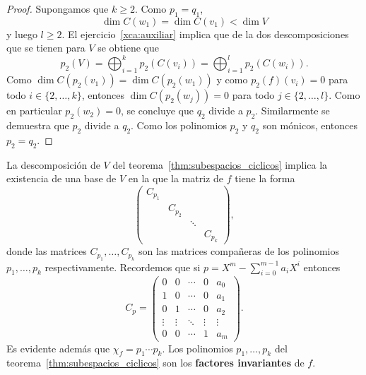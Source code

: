 \begin{thm}
\begin{proof}
        Supongamos que $k\geq2$. Como $p_1=q_1$, 
		\[
			\dim C(w_1)=\dim C(v_1)<\dim V
		\]
        y luego $l\geq2$.  El ejercicio~\ref{xca:auxiliar} implica que de la
        dos descomposiciones que se tienen para $V$ se obtiene que  
        \[
		p_2(V)=\bigoplus_{i=1}^k p_2(C(v_i))=\bigoplus_{i=1}^lp_2(C(w_i)).
        \]
        Como $\dim C(p_2(v_1))=\dim C(p_2(w_1))$ y como $p_2(f)(v_i)=0$ para
        todo $i\in\{2,\dots,k\}$, entonces $\dim C(p_2(w_j))=0$ para todo
        $j\in\{2,\dots,l\}$. Como en particular $p_2(w_2)=0$, se concluye que
        $q_2$ divide a $p_2$. Similarmente se demuestra que $p_2$ divide a
        $q_2$.  Como los polinomios $p_2$ y $q_2$ son mónicos, entonces
        $p_2=q_2$. 
    \end{proof}
\end{thm}

\begin{block}
	La descomposición de $V$ del teorema~\ref{thm:subespacios_ciclicos} implica
	la existencia de una base de $V$ en la que la matriz de $f$ tiene la forma
    \[
    \begin{pmatrix}
        C_{p_1} \\
        & C_{p_2}\\
        &&\ddots \\
        &&& C_{p_k}
    \end{pmatrix},
	\]
	donde las matrices $C_{p_1},\dots,C_{p_k}$ son las matrices compañeras de
	los polinomios $p_1,\dots,p_k$ respectivamente. Recordemos que 
    si $p=X^{m}-\sum_{i=0}^{m-1}a_iX^i$ entonces 
	\[
    C_{p}=\begin{pmatrix}
        0 & 0 & \cdots & 0 & a_0\\
        1 & 0 & \cdots & 0 & a_1\\
        0 & 1 & \cdots & 0 & a_2\\
        \vdots & \vdots & \ddots & \vdots & \vdots\\
        0 & 0 & \cdots & 1 & a_{m}
    \end{pmatrix}.
    \]
	Es evidente además que $\chi_f=p_1\cdots p_k$. Los polinomios
	$p_1,\dots,p_k$ del teorema~\ref{thm:subespacios_ciclicos} son los
	\textbf{factores invariantes} de $f$. 
\end{block}

